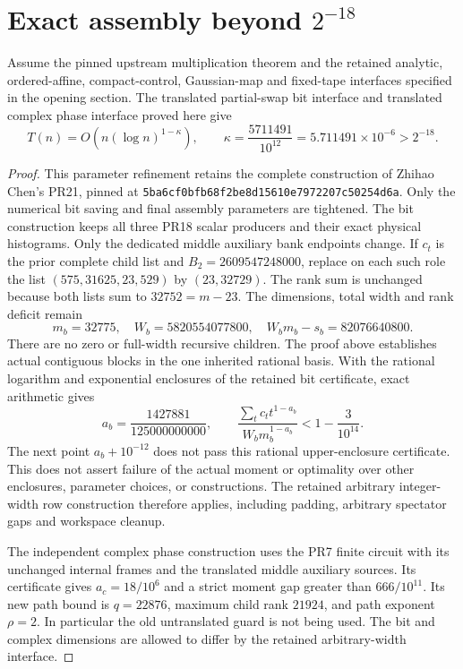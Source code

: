 \section{Exact assembly beyond $2^{-18}$}
\label{sec:translated-partial-assembly}

\begin{theorem}
Assume the pinned upstream multiplication theorem and the retained analytic,
ordered-affine, compact-control, Gaussian-map and fixed-tape interfaces
specified in the opening section. The translated partial-swap bit interface
and translated complex phase interface proved here give
\[
 T(n)=O\!\left(n(\log n)^{1-\kappa}\right),\qquad
 \boxed{\kappa=\frac{5711491}{10^{12}}=5.711491\times10^{-6}>2^{-18}}.
\]
\end{theorem}
\begin{proof}
This parameter refinement retains the complete construction of Zhihao
Chen's PR21, pinned at
\texttt{5ba6cf0bfb68f2be8d15610e7972207c50254d6a}.
Only the numerical bit saving and final assembly parameters are tightened.
The bit construction keeps all three PR18 scalar producers and their exact
physical histograms. Only the dedicated middle auxiliary bank endpoints
change. If $c_t$ is the prior complete child list and $B_2=2609547248000$,
replace on each such role the list $(575,31625,23,529)$ by $(23,32729)$.
The rank sum is unchanged because both lists sum to $32752=m-23$.
The dimensions, total width and rank deficit remain
\[
 m_b=32775,\quad W_b=5820554077800,\quad
 W_bm_b-s_b=82076640800.
\]
There are no zero or full-width recursive children. The proof above
establishes actual contiguous blocks in the one inherited rational basis.
With the rational logarithm and exponential enclosures of the retained
bit certificate, exact arithmetic gives
\[
 a_b=\frac{1427881}{125000000000},\qquad
 \frac{\sum_t c_t t^{1-a_b}}{W_bm_b^{1-a_b}}
 <1-\frac{3}{10^{14}}.
\]
The next point $a_b+10^{-12}$ does not pass this rational upper-enclosure
certificate. This does not assert failure of the actual moment or optimality
over other enclosures, parameter choices, or constructions.
The retained arbitrary integer-width row construction therefore applies,
including padding, arbitrary spectator gaps and workspace cleanup.

The independent complex phase construction uses the PR7 finite circuit
with its unchanged internal frames and the translated middle auxiliary
sources. Its certificate gives $a_c=18/10^6$ and a strict moment gap
greater than $666/10^{11}$. Its new path bound is $q=22876$, maximum
child rank $21924$, and path exponent $\rho=2$. In particular the old
untranslated guard is not being used. The bit and complex dimensions are
allowed to differ by the retained arbitrary-width interface.


\end{proof}
